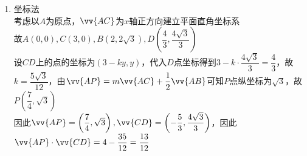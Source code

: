 \begin{enumerate}
\begin{enumerate}
\begin{jieda}
\begin{enumerate}
                    进一步来表示$\vv{CD}$，$\vv{CD} = \vv{AD} - \vv{AC} = \dfrac{2}{3} \vv{AB} - \vv{AC}$ \\
                    因此$\vv{AP} \cdot \vv{CD} = (\dfrac{1}{4} \vv{AC} + \dfrac{1}{2}\vv{AB}) \cdot (\dfrac{2}{3} \vv{AB} - \vv{AC}) = \dfrac{1}{6}\vv{AC} \cdot \vv{AB} + \dfrac{1}{3} |\vv{AB}|^2 - \dfrac{1}{4}|\vv{AC}|^2 - \dfrac{1}{2}\vv{AC} \cdot \vv{AB} = \dfrac{1}{3} |\vv{AB}|^2 - \dfrac{1}{4}|\vv{AC}|^2 - \dfrac{1}{3}\vv{AC} \cdot \vv{AB} = \dfrac{16}{3} - \dfrac{9}{4} - 2 = \dfrac{13}{12}$
                \item 坐标法 \\
                    考虑以$A$为原点，$\vv{AC}$为$x$轴正方向建立平面直角坐标系 \\
                    故$A(0, 0), C(3, 0), B(2, 2\sqrt{3}), D\left(\dfrac{4}{3}, \dfrac{4\sqrt{3}}{3}\right)$ \\
                    设$CD$上的点的坐标为$(3-ky, y)$，代入$D$点坐标得到$3 - k \cdot \dfrac{4\sqrt{3}}{3} = \dfrac{4}{3}$，故$k = \dfrac{5\sqrt{3}}{12}$，由$\vv{AP} = m\vv{AC} + \dfrac{1}{2}\vv{AB}$可知$P$点纵坐标为$\sqrt{3}$，故$P\left(\dfrac{7}{4}, \sqrt{3}\right)$ \\
                    因此$\vv{AP} = \left(\dfrac{7}{4}, \sqrt{3}\right), \vv{CD} = \left(-\dfrac{5}{3}, \dfrac{4\sqrt{3}}{3}\right)$，因此$\vv{AP} \cdot \vv{CD} = 4 - \dfrac{35}{12} = \dfrac{13}{12}$
            \end{enumerate}
        \end{jieda} 


\end{enumerate}
\end{enumerate}
